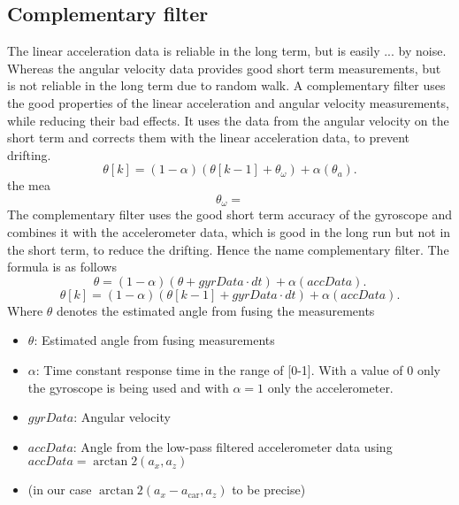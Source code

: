 \subsection{Complementary filter}
The linear acceleration data is reliable in the long term, but is easily ... by noise.
Whereas the angular velocity data provides good short term measurements, but is not reliable in the long term due to random walk.
A complementary filter uses the good properties of the linear acceleration and angular velocity measurements, while reducing their bad effects.
It uses the data from the angular velocity on the short term and corrects them with the linear acceleration data, to prevent drifting.
\begin{equation}
    \theta[k] = (1-\alpha)(\theta[k-1] + \theta_\omega) + \alpha(\theta_a).
\end{equation}
the mea
\begin{equation}
    \theta_\omega =
\end{equation}
The complementary filter uses the good short term accuracy of the gyroscope and combines it with the accelerometer data, which is good in the long run but not in the short term, to reduce the drifting.
Hence the name complementary filter. The formula is as follows
\begin{equation}
    \theta = (1-\alpha)(\theta + gyrData\cdot dt) + \alpha(accData).
\end{equation}
\begin{equation}
    \theta[k] = (1-\alpha)(\theta[k-1] + gyrData\cdot dt) + \alpha(accData).
\end{equation}
Where $\theta$ denotes the estimated angle from fusing the measurements
\begin{itemize}
    \item $\theta$: Estimated angle from fusing measurements
    \item $\alpha$: Time constant response time in the range of [0-1]. With a value of 0 only the gyroscope is being used and with $\alpha=1$ only the accelerometer.
    \item $gyrData$: Angular velocity
    \item $accData$: Angle from the low-pass filtered accelerometer data using $accData = \arctan2(a_x, a_z)$
        \item (in our case $\arctan2(a_x-a_\mathrm{car}, a_z)$ to be precise)
\end{itemize}


